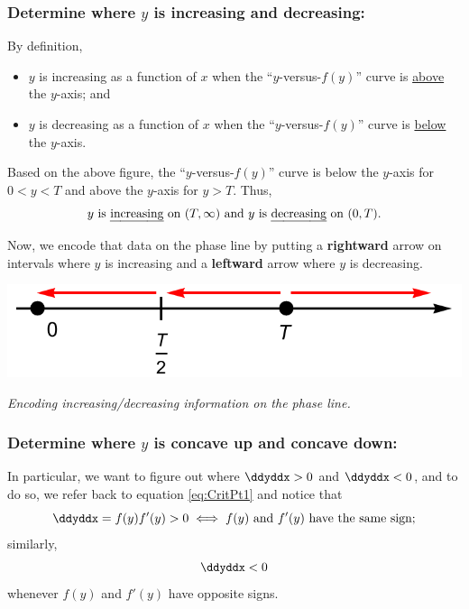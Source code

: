 \documentclass[12pt]{article}
\theoremstyle{definition}
\theoremstyle{underl}
\newcommand{\capt}[1]{\begin{adjustwidth}{0.5in}{0.5in}\centering\small\textit{#1}\end{adjustwidth}}
\begin{document}
	\subsubsection*{Determine where $y$ is increasing and decreasing:}\par
	By definition, 
	\begin{itemize}
		\item $y$ is increasing as a function of $x$ when the ``$y$-versus-$f(y)$'' curve is \ul{above} the $y$-axis; and
		\item $y$ is decreasing as a function of $x$ when the ``$y$-versus-$f(y)$'' curve is \ul{below} the $y$-axis.
	\end{itemize}

	Based on the above figure, the ``$y$-versus-$f(y)$'' curve is below the $y$-axis for $0<y<T$ and above the $y$-axis for $y>T$. Thus, 
	$$y\text{ is \ul{increasing} on }(T,\infty)\text{ and }y\text{ is \ul{decreasing} on }(0,T).$$
	
	Now, we encode that data on the phase line by putting a \textbf{rightward} arrow on intervals where $y$ is increasing and a \textbf{leftward} arrow where $y$ is decreasing.
	\vspace{1.5mm}
	\begin{center}
		\includegraphics[align=c,scale=0.75]{Ex1_Phase_3}
		\vspace{1.5mm}
		\capt{Encoding increasing/decreasing information on the phase line.}
	\end{center}

	\subsubsection*{Determine where $y$ is concave up and concave down:}\par
	In particular, we want to figure out where $\ddyddx>0$ and $\ddyddx<0$, and to do so, we refer back to equation \eqref{eq:CritPt1} and notice that
	$$\ddyddx=f(y)f'(y)>0\iff f(y)\text{ and }f'(y)\text{ have the same sign};$$
	similarly, 
	$$\ddyddx<0$$ whenever $f(y)$ and $f'(y)$ have opposite signs.
	
\end{document}
